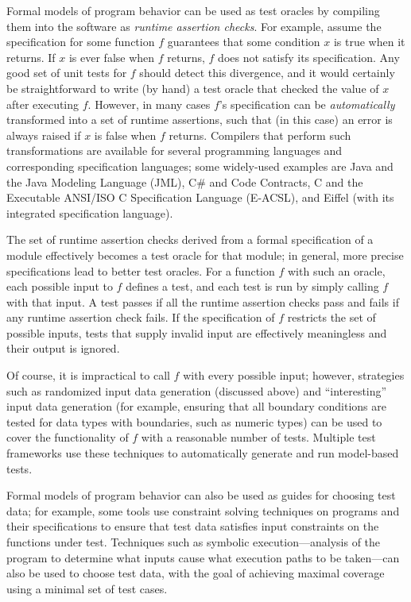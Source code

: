 Formal models of program behavior can be used as test oracles by
compiling them into the software as \emph{runtime assertion
  checks}. For example, assume the specification for some function $f$
guarantees that some condition $x$ is true when it returns. If $x$ is
ever false when $f$ returns, $f$ does not satisfy its
specification. Any good set of unit tests for $f$ should detect this
divergence, and it would certainly be straightforward to write (by
hand) a test oracle that checked the value of $x$ after executing
$f$. However, in many cases $f$'s specification can be
\emph{automatically} transformed into a set of runtime assertions,
such that (in this case) an error is always raised if $x$ is false
when $f$ returns.  Compilers that perform such transformations are
available for several programming languages and corresponding
specification languages; some widely-used examples are Java and the
Java Modeling Language (JML), C\# and Code Contracts, C and the
Executable ANSI/ISO C Specification Language (E-ACSL), and Eiffel
(with its integrated specification language).

The set of runtime assertion checks derived from a formal
specification of a module effectively becomes a test oracle for that
module; in general, more precise specifications lead to better test
oracles. For a function $f$ with such an oracle, each possible input
to $f$ defines a test, and each test is run by simply calling $f$ with
that input. A test passes if all the runtime assertion checks pass and
fails if any runtime assertion check fails. If the specification of
$f$ restricts the set of possible inputs, tests that supply invalid
input are effectively meaningless and their output is ignored.

Of course, it is impractical to call $f$ with every possible input;
however, strategies such as randomized input data generation
(discussed above) and ``interesting'' input data generation (for
example, ensuring that all boundary conditions are tested for data
types with boundaries, such as numeric types) can be used to cover the
functionality of $f$ with a reasonable number of tests. Multiple test
frameworks use these techniques to automatically generate and run
model-based tests.

Formal models of program behavior can also be used as guides for
choosing test data; for example, some tools use constraint solving
techniques on programs and their specifications to ensure that test
data satisfies input constraints on the functions under test.
Techniques such as symbolic execution---analysis of the program to
determine what inputs cause what execution paths to be taken---can
also be used to choose test data, with the goal of achieving maximal
coverage using a minimal set of test cases. 

